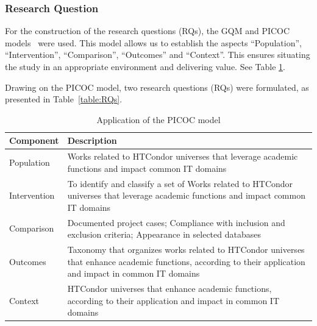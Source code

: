 \subsubsection{Research Question}
For the construction of the research questions (RQs), the GQM and PICOC models~\cite{Needleman20026, Petticrew2008systematic} were used. This model allows us to establish the aspects ``Population'', ``Intervention'', ``Comparison'', ``Outcomes'' and ``Context''. This ensures situating the study in an appropriate environment and delivering value. See Table \ref{table:PICOC}.

Drawing on the PICOC model, two research questions (RQs) were formulated, as presented in Table~\ref{table:RQs}.

\begin{table}[ht]
\renewcommand{\arraystretch}{1.3}
    \centering
	\caption{Application of the PICOC model}
    \begin{tabular}{p{1.8cm}p{5cm}}
        \hline
        \textbf{Component}    & \textbf{Description} \\
        \hline
        Population   & Works related to HTCondor universes that leverage academic functions and impact common IT domains \\
        Intervention & To identify and classify a set of Works related to HTCondor universes that leverage academic functions and impact common IT domains \\
        Comparison   & Documented project cases; Compliance with inclusion and exclusion criteria; Appearance in selected databases \\
        Outcomes     & Taxonomy that organizes works related to HTCondor universes that enhance academic functions, according to their application and impact in common IT domains \\
        Context      & HTCondor universes that enhance academic functions, according to their application and impact in common IT domains \\
        \hline
    \end{tabular}
	\label{table:PICOC}
\end{table}

